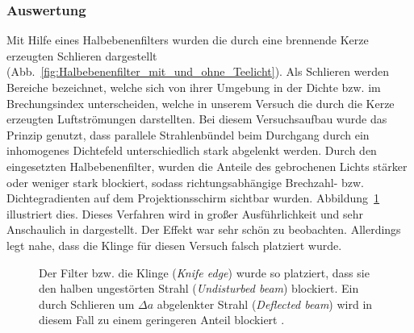\subsubsection*{Auswertung}
% 

Mit Hilfe eines Halbebenenfilters wurden die durch eine brennende Kerze erzeugten Schlieren dargestellt (Abb.~\ref{fig:Halbebenenfilter_mit_und_ohne_Teelicht}). Als Schlieren werden Bereiche bezeichnet, welche sich von ihrer Umgebung in der Dichte  bzw. im Brechungsindex unterscheiden, welche in unserem Versuch die durch  die Kerze erzeugten Luftströmungen darstellten. Bei diesem Versuchsaufbau  wurde das Prinzip genutzt, dass parallele Strahlenbündel beim  Durchgang durch ein inhomogenes Dichtefeld unterschiedlich stark abgelenkt werden. Durch den eingesetzten Halbebenenfilter, wurden die Anteile des gebrochenen  Lichts stärker oder weniger stark blockiert, sodass richtungsabhängige Brechzahl- bzw. Dichtegradienten auf dem Projektionsschirm sichtbar wurden. Abbildung~\ref{fig:schlieren_expl} illustriert dies. %
Dieses Verfahren wird in großer Ausführlichkeit und sehr Anschaulich in 
\cite[Kapitel 2]{panigrahi_schlieren_2012} dargestellt. Der Effekt war sehr schön zu beobachten. Allerdings legt 
\cite[Fig. 2.2]{panigrahi_schlieren_2012} nahe, dass die Klinge für diesen Versuch falsch platziert wurde.

\begin{figure}[h]
	\centering
	\caption[Anschauliche Erklärung des Schlierenverfahrens]{
		Der Filter bzw. die Klinge (\textit{Knife edge}) wurde so platziert, dass sie den halben ungestörten Strahl (\textit{Undisturbed beam}) blockiert. Ein durch Schlieren um $\Delta a$ abgelenkter Strahl (\textit{Deflected beam}) wird in diesem Fall zu einem geringeren Anteil blockiert \cite[Fig. 2.5]{panigrahi_schlieren_2012}.
	}
	\label{fig:schlieren_expl}
\end{figure}


